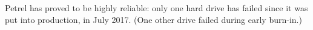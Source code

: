 \documentclass[sigconf]{acmart}
\begin{document}
Petrel has proved to be highly reliable: only one hard drive has failed 
since it was put into production, in July 2017.
(One other drive failed during early burn-in.)


%
\end{document}
